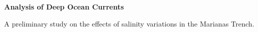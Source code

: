 \documentclass{article}
\begin{document}
\Huge
\begin{center}
\textbf{Analysis of Deep Ocean Currents}
\end{center}
\vspace{2cm}
\Large
A preliminary study on the effects of salinity variations in the Marianas Trench.
\end{document}

